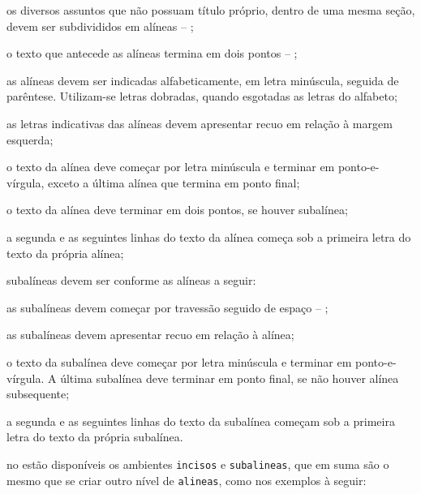 \begin{alineas}

  \item os diversos assuntos que não possuam título próprio, dentro de uma mesma
  seção, devem ser subdivididos em alíneas -- \showfont;

  \item o texto que antecede as alíneas termina em dois pontos -- \showfont;
  \item as alíneas devem ser indicadas alfabeticamente, em letra minúscula,
  seguida de parêntese. Utilizam-se letras dobradas, quando esgotadas as
  letras do alfabeto;

  \item as letras indicativas das alíneas devem apresentar recuo em relação à
  margem esquerda;

  \item o texto da alínea deve começar por letra minúscula e terminar em
  ponto-e-vírgula, exceto a última alínea que termina em ponto final;

  \item o texto da alínea deve terminar em dois pontos, se houver subalínea;

  \item a segunda e as seguintes linhas do texto da alínea começa sob a
  primeira letra do texto da própria alínea;

  \item subalíneas \cite[4.3]{NBR6024:2012} devem ser conforme as alíneas a
  seguir:

  \begin{alineas}
     \item as subalíneas devem começar por travessão seguido de espaço -- \showfont;

     \item as subalíneas devem apresentar recuo em relação à alínea;

     \item o texto da subalínea deve começar por letra minúscula e terminar em
     ponto-e-vírgula. A última subalínea deve terminar em ponto final, se não
     houver alínea subsequente;

     \item a segunda e as seguintes linhas do texto da subalínea começam sob a
     primeira letra do texto da própria subalínea.
  \end{alineas}

  \item no \abnTeX{} estão disponíveis os ambientes \texttt{incisos} e
  \texttt{subalineas}, que em suma são o mesmo que se criar outro nível de
  \texttt{alineas}, como nos exemplos à seguir:


\end{alineas}
